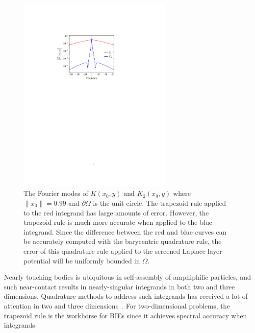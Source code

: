 \begin{figure}
\centerline{\includegraphics[width=3.0in]{figures/integrands}}
\vspace*{-10pt}
\caption{{\footnotesize The Fourier modes of $K(x_0,y)$ and $K_2(x_0,y)$
  where $\|x_0\| = 0.99$ and $\partial\Omega$ is the unit circle. The
  trapezoid rule applied to the red integrand has large amounts of
  error. However, the trapezoid rule is much more accurate when applied
  to the blue integrand. Since the difference between the red and blue
  curves can be accurately computed with the barycentric quadrature
  rule, the error of this quadrature rule applied to the screened
  Laplace layer potential will be uniformly bounded in $\Omega$.}}
\label{fig:integrands}
\end{figure}
Nearly touching bodies is ubiquitous in self-assembly of amphiphilic
particles, and such near-contact results in nearly-singular integrands
in both two and three dimensions. Quadrature methods to address such
integrands has received a lot of attention in two and three
dimensions~\cite{alpert, kapur, sidi, duffy, bruno1, bruno2, davis_1984,
graglia_2008, hackbusch_sauter_1994, jarvenpaa_2003, khayat_2005,
schwab_1992, ying_2006, beale1, beale2, goodman_1990, haroldson_1998,
lowengrub_1993, schwab_1992, ggq1, ggq2, ggq3, helsing_2008a,
helsing_integral_2009, helsing_tutorial_2012, klockner2013jcp, qbx2,
wala2019jcp, af2018sisc, siegel2018jcp, rachh2017jcp, ding2019arxiv,
bar2014}. For two-dimensional problems, the trapezoid rule is the
workhorse for BIEs since it achieves spectral accuracy when integrands
